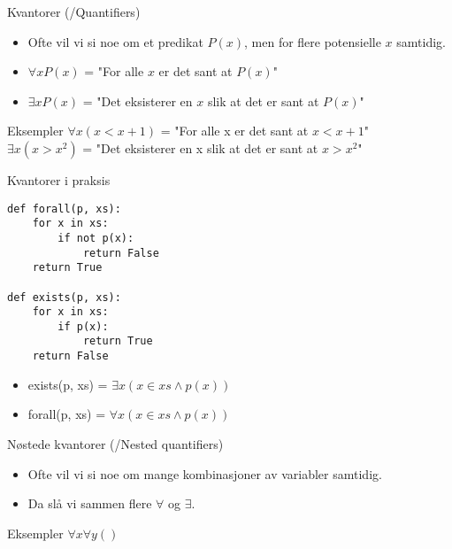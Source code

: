 \begin{frame}{Kvantorer (/Quantifiers)}
    \begin{itemize}
        \item Ofte vil vi si noe om et predikat $P(x)$, men for flere potensielle $x$ samtidig.
        \item $\forall x P(x)$ = "For alle $x$ er det sant at $P(x)$"
        \item $\exists x P(x)$ = "Det eksisterer en $x$ slik at det er sant at $P(x)$"
    \end{itemize}
    
    \begin{block}{Eksempler}
        $\forall x (x < x + 1)$ = "For alle x er det sant at $x < x +1$"\\[5mm]
        $\exists x (x > x^2)$ = "Det eksisterer en x slik at det er sant at $x > x^2$"
    \end{block}
\end{frame}

\begin{frame}[fragile]{Kvantorer i praksis}
    \begin{verbatim}
def forall(p, xs):
    for x in xs:
        if not p(x):
            return False
    return True
    
def exists(p, xs):
    for x in xs:
        if p(x):
            return True
    return False
    \end{verbatim}
    
    \begin{itemize}
        \item exists(p, xs) = $\exists x (x \in xs \land p(x))$
        \item forall(p, xs) = $\forall x (x \in xs \land p(x))$
    \end{itemize}
\end{frame}

\begin{frame}{Nøstede kvantorer (/Nested quantifiers)}
    \begin{itemize}
        \item Ofte vil vi si noe om mange kombinasjoner av variabler samtidig.
        \item Da slå vi sammen flere $\forall$ og $\exists$.
    \end{itemize}
    
    \begin{block}{Eksempler}
        $\forall x \forall y ()$
    \end{block}
\end{frame}

